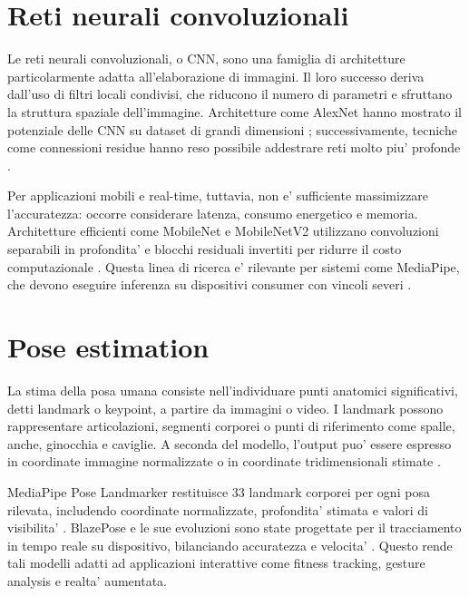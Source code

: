 \section{Reti neurali convoluzionali}

Le reti neurali convoluzionali, o CNN, sono una famiglia di architetture particolarmente adatta all'elaborazione di immagini. Il loro successo deriva dall'uso di filtri locali condivisi, che riducono il numero di parametri e sfruttano la struttura spaziale dell'immagine. Architetture come AlexNet hanno mostrato il potenziale delle CNN su dataset di grandi dimensioni \cite{krizhevsky2012imagenet}; successivamente, tecniche come connessioni residue hanno reso possibile addestrare reti molto piu' profonde \cite{he2016resnet}.

Per applicazioni mobili e real-time, tuttavia, non e' sufficiente massimizzare l'accuratezza: occorre considerare latenza, consumo energetico e memoria. Architetture efficienti come MobileNet e MobileNetV2 utilizzano convoluzioni separabili in profondita' e blocchi residuali invertiti per ridurre il costo computazionale \cite{howard2017mobilenets,sandler2018mobilenetv2}. Questa linea di ricerca e' rilevante per sistemi come MediaPipe, che devono eseguire inferenza su dispositivi consumer con vincoli severi \cite{bazarevsky2020blazepose,lugaresi2019mediapipe}.

\section{Pose estimation}

La stima della posa umana consiste nell'individuare punti anatomici significativi, detti landmark o keypoint, a partire da immagini o video. I landmark possono rappresentare articolazioni, segmenti corporei o punti di riferimento come spalle, anche, ginocchia e caviglie. A seconda del modello, l'output puo' essere espresso in coordinate immagine normalizzate o in coordinate tridimensionali stimate \cite{mediapipePoseWeb2026}.

MediaPipe Pose Landmarker restituisce 33 landmark corporei per ogni posa rilevata, includendo coordinate normalizzate, profondita' stimata e valori di visibilita' \cite{mediapipePoseWeb2026,mediapipePoseOverview2026}. BlazePose e le sue evoluzioni sono state progettate per il tracciamento in tempo reale su dispositivo, bilanciando accuratezza e velocita' \cite{bazarevsky2020blazepose,grishchenko2022blazepose}. Questo rende tali modelli adatti ad applicazioni interattive come fitness tracking, gesture analysis e realta' aumentata.

